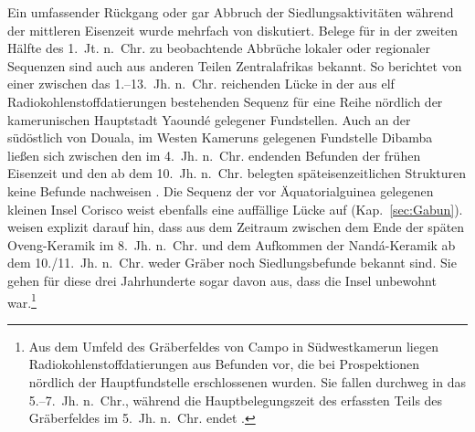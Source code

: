 Ein umfassender Rückgang oder gar Abbruch der Siedlungsaktivitäten während der mittleren Eisenzeit wurde mehrfach von \textcites[101--103~Abb.~9]{Oslisly.1998}[112\,f.~Abb.~7.9]{Oslisly.2001d}{Oslisly.2013}{Oslisly.2013b} diskutiert. Belege für in der zweiten Hälfte des 1.~Jt. n.~Chr. zu beobachtende Abbrüche lokaler oder regionaler Sequenzen sind auch aus anderen Teilen Zentralafrikas bekannt. So berichtet \textcite{Leka.2008} von einer zwischen das 1.--13.~Jh. n.~Chr. reichenden Lücke in der aus elf Radiokohlenstoffdatierungen bestehenden Sequenz für eine Reihe nördlich der kamerunischen Hauptstadt Yaoundé gelegener Fundstellen. Auch an der südöstlich von Douala, im Westen Kameruns gelegenen Fundstelle Dibamba ließen sich zwischen den im 4.~Jh. n.~Chr. endenden Befunden der frühen Eisenzeit und den ab dem 10.~Jh. n.~Chr. belegten späteisenzeitlichen Strukturen keine Befunde nachweisen \parencites{Oslisly.2008}[377--380, 379 Abb.~36.6]{GouemGouem.20102011}. Die Sequenz der vor Äquatorialguinea gelegenen kleinen Insel Corisco weist ebenfalls eine auffällige Lücke auf (Kap.~\ref{sec:Gabun}). \textcite[355\,f.]{SanchezElipe.2016} weisen explizit darauf hin, dass aus dem Zeitraum zwischen dem Ende der späten Oveng-Keramik im 8.~Jh. n.~Chr. und dem Aufkommen der Nandá-Keramik ab dem 10./11.~Jh. n.~Chr. weder Gräber noch Siedlungsbefunde bekannt sind. Sie gehen für diese drei Jahrhunderte sogar davon aus, dass die Insel unbewohnt war.\footnote{Aus dem Umfeld des Gräberfeldes von Campo in Südwestkamerun liegen Radiokohlenstoffdatierungen aus Befunden vor, die bei Prospektionen nördlich der Hauptfundstelle erschlossenen wurden. Sie fallen durchweg in das 5.--7.~Jh. n.~Chr., während die Hauptbelegungszeit des erfassten Teils des Gräberfeldes im 5.~Jh. n.~Chr. endet \parencite[62\,f. Abb.~4.1]{Seidensticker.2016}.}

